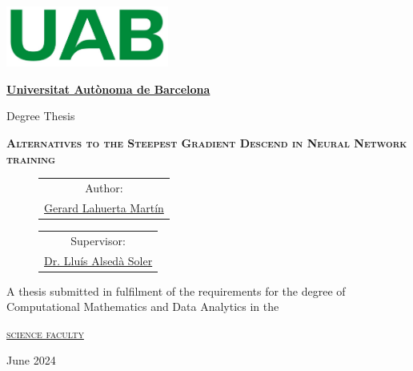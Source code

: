 \documentclass[a4paper, 11pt]{article}
\begin{document}
\pagestyle{plain}

\begin{titlepage}
    \centering
    {\includegraphics[width=0.4\textwidth]{PORTADA/UAB.png}\par}
    \vspace{1cm}
    {\bfseries\LARGE \href{https://www.uab.cat/}{Universitat Autònoma de Barcelona} \par}
    \vspace{2cm}
    {\Large Degree Thesis \par}
    \vspace{2em}
    \hline
    \vspace{1cm}
    {\scshape\Huge \textbf{Alternatives to the Steepest Gradient Descend in Neural Network training} \par}
    \vspace{1cm}
    \hline
    \vspace{2cm}
    {\Large
    \begin{figure}[h]
    \hspace{-6.5em}
        \begin{minipage}{10cm} \centering %
            \begin{tabular}{c}
                Author: \\
                \href{https://github.com/Gerard-Lahuerta}{Gerard Lahuerta Martín}
            \end{tabular}
        \end{minipage}
        \begin{minipage}{10cm} \centering %
            \begin{tabular}{c}
                Supervisor: \\
                \href{https://mat.uab.cat/~alseda/}{Dr. Lluís Alsedà Soler}
            \end{tabular}
        \end{minipage}
    \end{figure}\par}
    \vspace{2cm}
    {\scshape 
        \begin{minipage}{10cm} \centering %
            A thesis submitted in fulfilment of the requirements
            for the degree of Computational Mathematics and Data Analytics in the
        \end{minipage} 
    \par} 
    \vspace{2em}
    {\scshape\Large \href{https://www.uab.cat/ciencies}{science faculty} \par}
    \vfill
    {\Large June 2024 \par}
\end{titlepage}
\end{document}

